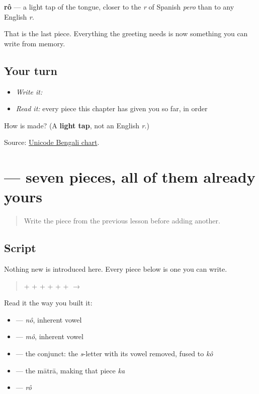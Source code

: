 \textbf{rô} — a light tap of the tongue, closer to the \emph{r} of Spanish \emph{pero} than to any English \emph{r}.

That is the last piece. Everything the greeting needs is now something you can write from memory.

\subsection*{Your turn}
\begin{itemize}
\raggedright
  \item \emph{Write it:} 
  \item \emph{Read it:} every piece this chapter has given you so far, in order
\end{itemize}

\begin{tcolorbox}[breakable,colback=teal!4,colframe=teal!35!black,title={Before you move on}]
How is \textbf{} made? (A \textbf{light tap}, not an English \emph{r}.)

Source: \href{https://www.unicode.org/charts/PDF/U0980.pdf}{Unicode Bengali chart}.
\end{tcolorbox}
\section[nomoshkar]{ — seven pieces, all of them already yours}

\label{lesson:BN-W01-nomoshkar-read}



\begin{quote}
Write the piece from the previous lesson before adding another.
\end{quote}

\subsection*{Script}
Nothing new is introduced here. Every piece below is one you can write.

\begin{quote}
\textbf{} + \textbf{} + \textbf{} + \textbf{} + \textbf{} + \textbf{} + \textbf{} $\to$ \textbf{}
\end{quote}

Read it the way you built it:

\begin{itemize}
\raggedright
  \item \textbf{} — \emph{nô}, inherent vowel
  \item \textbf{} — \emph{mô}, inherent vowel
  \item \textbf{} — the conjunct: the \emph{s}-letter with its vowel removed, fused to \emph{kô}
  \item \textbf{} — the mātrā, making that piece \emph{ka}
  \item \textbf{} — \emph{rô}
\end{itemize}

